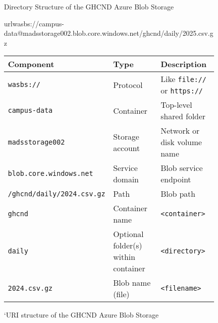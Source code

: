 \documentclass[11pt]{article}
\begin{document}
\begin{figure}[H]
    \centering
\caption{Directory Structure of the GHCND Azure Blob Storage}
\label{fig-ghcnd-tree}
\end{figure}
\begin{figure}[htbp]
   url{wasbs://campus-data@madsstorage002.blob.core.windows.net/ghcnd/daily/2025.csv.gz}\par
    \centering
    \begin{minipage}{0.7\textwidth}
    \centering
    
\begin{tabular}{@{}L{0.50\textwidth} L{0.20\textwidth} L{0.40\textwidth}@{}}
\toprule
\textbf{Component} & \textbf{Type} & \textbf{Description} \\
\midrule
\texttt{wasbs://} & Protocol & Like \texttt{file://} or \texttt{https://}\vspace{0.5\baselineskip} \\
\texttt{campus-data} & Container & Top-level shared folder\vspace{0.5\baselineskip} \\
\texttt{madsstorage002} & Storage account\vspace{0.5\baselineskip} & Network or disk volume name \\
\texttt{blob.core.windows.net} & Service domain\vspace{0.5\baselineskip} & Blob service endpoint  \\
\texttt{/ghcnd/daily/2024.csv.gz} & Path & Blob path\vspace{0.5\baselineskip} \\
\texttt{ghcnd} & Container name\vspace{0.5\baselineskip} & \texttt{<container>} \\
\texttt{daily} & Optional folder(s) within container\vspace{0.5\baselineskip} & \texttt{<directory>}\\
\texttt{2024.csv.gz} & Blob name (file) &  \texttt{<filename>} \\
\bottomrule
\end{tabular}
\caption{`URI structure of the GHCND Azure Blob Storage}
\label{fig-azure-url}
\end{minipage}
\end{figure}
\bigskip
\end{document}

